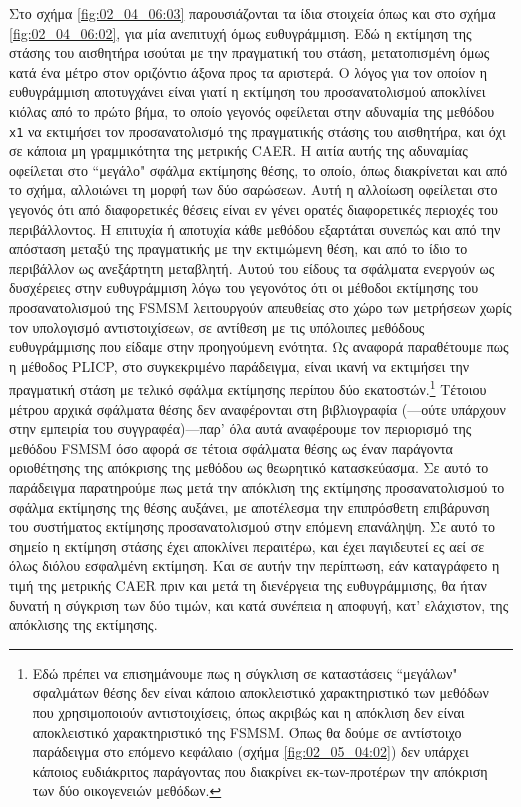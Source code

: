 Στο σχήμα \ref{fig:02_04_06:03} παρουσιάζονται τα ίδια στοιχεία όπως και στο
σχήμα \ref{fig:02_04_06:02}, για μία ανεπιτυχή όμως ευθυγράμμιση. Εδώ η
εκτίμηση της στάσης του αισθητήρα ισούται με την πραγματική του στάση,
μετατοπισμένη όμως κατά ένα μέτρο στον οριζόντιο άξονα προς τα αριστερά. Ο
λόγος για τον οποίον η ευθυγράμμιση αποτυγχάνει είναι γιατί η εκτίμηση του
προσανατολισμού αποκλίνει κιόλας από το πρώτο βήμα, το οποίο γεγονός οφείλεται
στην αδυναμία της μεθόδου \texttt{x1} να εκτιμήσει τον προσανατολισμό της
πραγματικής στάσης του αισθητήρα, και όχι σε κάποια μη γραμμικότητα της
μετρικής CAER. Η αιτία αυτής της αδυναμίας οφείλεται στο ``μεγάλο" σφάλμα
εκτίμησης θέσης, το οποίο, όπως διακρίνεται και από το σχήμα, αλλοιώνει τη
μορφή των δύο σαρώσεων. Αυτή η αλλοίωση οφείλεται στο γεγονός ότι από
διαφορετικές θέσεις είναι εν γένει ορατές διαφορετικές περιοχές του
περιβάλλοντος.  Η επιτυχία ή αποτυχία κάθε μεθόδου εξαρτάται συνεπώς και από
την απόσταση μεταξύ της πραγματικής με την εκτιμώμενη θέση, και από το ίδιο το
περιβάλλον ως ανεξάρτητη μεταβλητή.  Αυτού του είδους τα σφάλματα ενεργούν ως
δυσχέρειες στην ευθυγράμμιση λόγω του γεγονότος ότι οι μέθοδοι εκτίμησης του
προσανατολισμού της FSMSM λειτουργούν απευθείας στο χώρο των μετρήσεων χωρίς
τον υπολογισμό αντιστοιχίσεων, σε αντίθεση με τις υπόλοιπες μεθόδους
ευθυγράμμισης που είδαμε στην προηγούμενη ενότητα. Ως αναφορά παραθέτουμε πως η
μέθοδος PLICP, στο συγκεκριμένο παράδειγμα, είναι ικανή να εκτιμήσει την
πραγματική στάση με τελικό σφάλμα εκτίμησης περίπου δύο εκατοστών.\footnote{Εδώ
πρέπει να επισημάνουμε πως η σύγκλιση σε καταστάσεις ``μεγάλων" σφαλμάτων θέσης
δεν είναι κάποιο αποκλειστικό χαρακτηριστικό των μεθόδων που χρησιμοποιούν
αντιστοιχίσεις, όπως ακριβώς και η απόκλιση δεν είναι αποκλειστικό
χαρακτηριστικό της FSMSM.  Όπως θα δούμε σε αντίστοιχο παράδειγμα στο επόμενο
κεφάλαιο (σχήμα \ref{fig:02_05_04:02}) δεν υπάρχει κάποιος ευδιάκριτος
παράγοντας που διακρίνει εκ-των-προτέρων την απόκριση των δύο οικογενειών
μεθόδων.} Τέτοιου μέτρου αρχικά σφάλματα θέσης δεν αναφέρονται στη βιβλιογραφία
(---ούτε υπάρχουν στην εμπειρία του συγγραφέα)---παρ' όλα αυτά αναφέρουμε τον
περιορισμό της μεθόδου FSMSM όσο αφορά σε τέτοια σφάλματα θέσης ως έναν
παράγοντα οριοθέτησης της απόκρισης της μεθόδου ως θεωρητικό κατασκεύασμα. Σε
αυτό το παράδειγμα παρατηρούμε πως μετά την απόκλιση της εκτίμησης
προσανατολισμού το σφάλμα εκτίμησης της θέσης αυξάνει, με αποτέλεσμα την
επιπρόσθετη επιβάρυνση του συστήματος εκτίμησης προσανατολισμού στην επόμενη
επανάληψη. Σε αυτό το σημείο η εκτίμηση στάσης έχει αποκλίνει περαιτέρω, και
έχει παγιδευτεί ες αεί σε όλως διόλου εσφαλμένη εκτίμηση. Και σε αυτήν την
περίπτωση, εάν καταγράφετο η τιμή της μετρικής CAER πριν και μετά τη διενέργεια
της ευθυγράμμισης, θα ήταν δυνατή η σύγκριση των δύο τιμών, και κατά συνέπεια η
αποφυγή, κατ' ελάχιστον, της απόκλισης της εκτίμησης.

